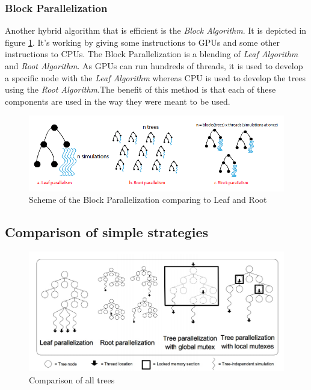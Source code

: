 \subsubsection{Block Parallelization}

Another hybrid algorithm that is efficient is the \emph{Block Algorithm}\cite{GPU}.  It is depicted in figure \ref{block}. It's working by giving some instructions to GPUs and some other instructions to CPUs. The Block Parallelization is a blending of \emph{Leaf Algorithm} and \emph{Root Algorithm}. As GPUs can run hundreds of threads, it is used to develop a specific node with the \emph{Leaf Algorithm} whereas CPU is used to develop the trees using the \emph{Root Algorithm}.The benefit of this method is that each of these components are used in the way they were meant to be used.

\begin{figure}[!h] 
\centerline{\includegraphics[scale=0.60]{2_State_of_the_art/Strategy_of_root_parallelization_Mikail/block.png}}
   \caption{\label{étiquette} Scheme of the Block Parallelization comparing to Leaf and Root}
\label{block}
\end{figure}

\subsection{Comparison of simple strategies}
\begin{figure}[!h] 
\centerline{\includegraphics[scale=0.60]{2_State_of_the_art/Strategy_of_root_parallelization_Mikail/impara.png}}
   \caption{\label{étiquette} Comparison of all trees}
\label{comp_algo}
\end{figure}

